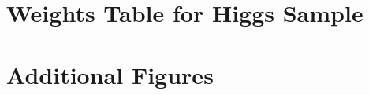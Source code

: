 \chapter{Weights Table for Higgs Sample}
\newpage\phantom{blabla}


\chapter{Additional Figures}
\newpage\phantom{blabla}
